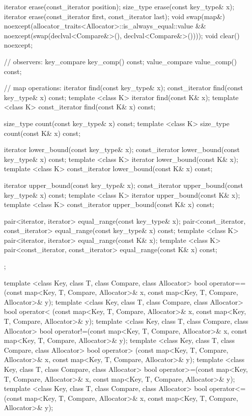 \begin{codeblock}
{{    iterator  erase(const_iterator position);
    size_type erase(const key_type& x);
    iterator  erase(const_iterator first, const_iterator last);
    void      swap(map&)
      noexcept(allocator_traits<Allocator>::is_always_equal::value &&
               noexcept(swap(declval<Compare&>(), declval<Compare&>())));
    void      clear() noexcept;

    // observers:
    key_compare key_comp() const;
    value_compare value_comp() const;

    // map operations:
    iterator       find(const key_type& x);
    const_iterator find(const key_type& x) const;
    template <class K> iterator       find(const K& x);
    template <class K> const_iterator find(const K& x) const;

    size_type      count(const key_type& x) const;
    template <class K> size_type count(const K& x) const;

    iterator       lower_bound(const key_type& x);
    const_iterator lower_bound(const key_type& x) const;
    template <class K> iterator       lower_bound(const K& x);
    template <class K> const_iterator lower_bound(const K& x) const;

    iterator       upper_bound(const key_type& x);
    const_iterator upper_bound(const key_type& x) const;
    template <class K> iterator       upper_bound(const K& x);
    template <class K> const_iterator upper_bound(const K& x) const;

    pair<iterator, iterator>               equal_range(const key_type& x);
    pair<const_iterator, const_iterator>   equal_range(const key_type& x) const;
    template <class K>
      pair<iterator, iterator>             equal_range(const K& x);
    template <class K>
      pair<const_iterator, const_iterator> equal_range(const K& x) const;
  };

  template <class Key, class T, class Compare, class Allocator>
    bool operator==(const map<Key, T, Compare, Allocator>& x,
                    const map<Key, T, Compare, Allocator>& y);
  template <class Key, class T, class Compare, class Allocator>
    bool operator< (const map<Key, T, Compare, Allocator>& x,
                    const map<Key, T, Compare, Allocator>& y);
  template <class Key, class T, class Compare, class Allocator>
    bool operator!=(const map<Key, T, Compare, Allocator>& x,
                    const map<Key, T, Compare, Allocator>& y);
  template <class Key, class T, class Compare, class Allocator>
    bool operator> (const map<Key, T, Compare, Allocator>& x,
                    const map<Key, T, Compare, Allocator>& y);
  template <class Key, class T, class Compare, class Allocator>
    bool operator>=(const map<Key, T, Compare, Allocator>& x,
                    const map<Key, T, Compare, Allocator>& y);
  template <class Key, class T, class Compare, class Allocator>
    bool operator<=(const map<Key, T, Compare, Allocator>& x,
                    const map<Key, T, Compare, Allocator>& y);

}
\end{codeblock}
